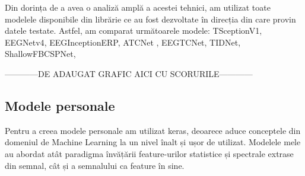 Din dorința de a avea o analiză amplă a acestei tehnici, am utilizat toate modelele disponibile din librărie ce au fost dezvoltate în direcția din care provin datele testate. Astfel, am comparat următoarele modele: TSceptionV1, EEGNetv4\cite{eegnetv4}, EEGInceptionERP\cite{eeginceptionerp}, ATCNet \cite{atcnet1}\cite{atcnet2}\cite{atcnet3}, EEGTCNet\cite{tcnet}, TIDNet\cite{tidnet}, ShallowFBCSPNet\cite{ShallowFBCSPNet}, 

------------DE ADAUGAT GRAFIC AICI CU SCORURILE------------

\subsection{Modele personale}
Pentru a creea modele personale am utilizat keras, deoarece aduce conceptele din domeniul de Machine Learning la un nivel înalt și ușor de utilizat. Modelele mele au abordat atât paradigma învățării feature-urilor statistice și spectrale extrase din semnal, cât și a semnalului ca feature în sine.